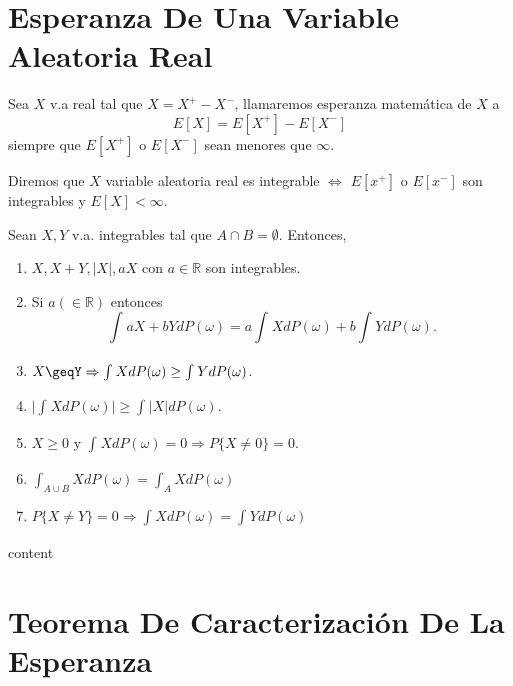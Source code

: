 \section{Esperanza De Una Variable Aleatoria Real}

\begin{defn}
  Sea $X$ v.a real tal que $X = X^{+} - X^{-}$, llamaremos esperanza matemática de $X$ a
  \[ 
    E[X] = E [ X^{+} ] - E [ X^{-} ]
  \] 
  siempre que $E [ X^{+} ]$ o $E [ X^{-} ]$ sean menores que $\infty$.
\end{defn}

\begin{defn}
  Diremos que $X$ variable aleatoria real es integrable $\Leftrightarrow$ $E[x^{+}]$ o $E[x^{-}]$ son integrables y $E[X] < \infty$.
\end{defn}

\begin{prop}
  Sean $X, Y$ v.a. integrables tal que $A \cap B = \emptyset$. Entonces,
  \begin{enumerate}[label=(\roman*)]
    \item $X, X+ Y, | X |, aX$ con $a \in \mathbb{R}$ son integrables.
    \item Si $a( \in \mathbb{R})$ entonces 
      \[ 
        \int_{}^{} aX + bY dP(\omega) = a \int_{}^{} X dP(\omega) + b \int_{}^{} Y dP(\omega).
      \] 
    \item $X \geqY \Rightarrow \int_{}^{} X dP(\omega) \geq \int_{}^{}  Y dP(\omega)$.
    \item $\Big | \int_{}^{} X dP(\omega) \Big | \geq \int_{}^{} | X | dP(\omega)$.
    \item $X \geq 0$ y $\int_{}^{} X dP(\omega) = 0 \Rightarrow P \{ X \neq 0 \} = 0$.
    \item $\int_{A \cup B}^{} X dP(\omega) = \int_{A}^{} X dP(\omega)$
    \item $P \{ X \neq Y \} = 0 \Rightarrow \int_{}^{} X dP(\omega) = \int_{}^{} Y dP(\omega)$
  \end{enumerate}
\end{prop}

\begin{dem}
  content
\end{dem}

\section{Teorema De Caracterización De La Esperanza}

